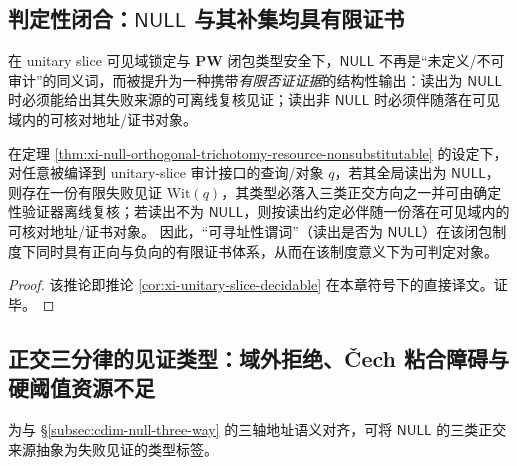 \subsection{判定性闭合：\texorpdfstring{$\mathsf{NULL}$}{NULL} 与其补集均具有限证书}\label{subsec:cdim-null-decidability-closure}
在 unitary slice 可见域锁定与 \(\mathbf{PW}\) 闭包类型安全下，\(\mathsf{NULL}\) 不再是“未定义/不可审计”的同义词，而被提升为一种携带\emph{有限否证证据}的结构性输出：读出为 \(\mathsf{NULL}\) 时必须能给出其失败来源的可离线复核见证；读出非 \(\mathsf{NULL}\) 时必须伴随落在可见域内的可核对地址/证书对象。

\begin{corollary}\label{cor:cdim-unitary-slice-decidable}
在定理 \ref{thm:xi-null-orthogonal-trichotomy-resource-nonsubstitutable} 的设定下，对任意被编译到 unitary-slice 审计接口的查询/对象 \(q\)，若其全局读出为 \(\mathsf{NULL}\)，则存在一份有限失败见证 \(\mathrm{Wit}(q)\)，其类型必落入三类正交方向之一并可由确定性验证器离线复核；若读出不为 \(\mathsf{NULL}\)，则按读出约定必伴随一份落在可见域内的可核对地址/证书对象。
因此，“可寻址性谓词”（读出是否为 \(\mathsf{NULL}\)）在该闭包制度下同时具有正向与负向的有限证书体系，从而在该制度意义下为可判定对象。
\end{corollary}
\begin{proof}
该推论即推论 \ref{cor:xi-unitary-slice-decidable} 在本章符号下的直接译文。证毕。
\end{proof}

\subsection{正交三分律的见证类型：域外拒绝、\v{C}ech 粘合障碍与硬阈值资源不足}\label{subsec:cdim-null-witness-tags}
为与 \S\ref{subsec:cdim-null-three-way} 的三轴地址语义对齐，可将 \(\mathsf{NULL}\) 的三类正交来源抽象为失败见证的类型标签。


